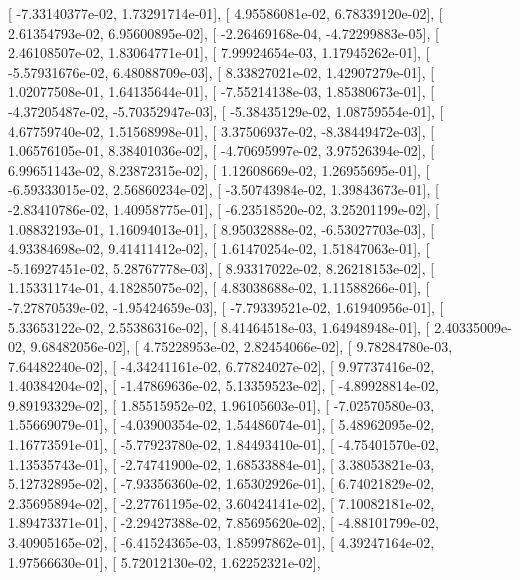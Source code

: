 \documentclass{article}
\begin{document}
       [ -7.33140377e-02,   1.73291714e-01],
       [  4.95586081e-02,   6.78339120e-02],
       [  2.61354793e-02,   6.95600895e-02],
       [ -2.26469168e-04,  -4.72299883e-05],
       [  2.46108507e-02,   1.83064771e-01],
       [  7.99924654e-03,   1.17945262e-01],
       [ -5.57931676e-02,   6.48088709e-03],
       [  8.33827021e-02,   1.42907279e-01],
       [  1.02077508e-01,   1.64135644e-01],
       [ -7.55214138e-03,   1.85380673e-01],
       [ -4.37205487e-02,  -5.70352947e-03],
       [ -5.38435129e-02,   1.08759554e-01],
       [  4.67759740e-02,   1.51568998e-01],
       [  3.37506937e-02,  -8.38449472e-03],
       [  1.06576105e-01,   8.38401036e-02],
       [ -4.70695997e-02,   3.97526394e-02],
       [  6.99651143e-02,   8.23872315e-02],
       [  1.12608669e-02,   1.26955695e-01],
       [ -6.59333015e-02,   2.56860234e-02],
       [ -3.50743984e-02,   1.39843673e-01],
       [ -2.83410786e-02,   1.40958775e-01],
       [ -6.23518520e-02,   3.25201199e-02],
       [  1.08832193e-01,   1.16094013e-01],
       [  8.95032888e-02,  -6.53027703e-03],
       [  4.93384698e-02,   9.41411412e-02],
       [  1.61470254e-02,   1.51847063e-01],
       [ -5.16927451e-02,   5.28767778e-03],
       [  8.93317022e-02,   8.26218153e-02],
       [  1.15331174e-01,   4.18285075e-02],
       [  4.83038688e-02,   1.11588266e-01],
       [ -7.27870539e-02,  -1.95424659e-03],
       [ -7.79339521e-02,   1.61940956e-01],
       [  5.33653122e-02,   2.55386316e-02],
       [  8.41464518e-03,   1.64948948e-01],
       [  2.40335009e-02,   9.68482056e-02],
       [  4.75228953e-02,   2.82454066e-02],
       [  9.78284780e-03,   7.64482240e-02],
       [ -4.34241161e-02,   6.77824027e-02],
       [  9.97737416e-02,   1.40384204e-02],
       [ -1.47869636e-02,   5.13359523e-02],
       [ -4.89928814e-02,   9.89193329e-02],
       [  1.85515952e-02,   1.96105603e-01],
       [ -7.02570580e-03,   1.55669079e-01],
       [ -4.03900354e-02,   1.54486074e-01],
       [  5.48962095e-02,   1.16773591e-01],
       [ -5.77923780e-02,   1.84493410e-01],
       [ -4.75401570e-02,   1.13535743e-01],
       [ -2.74741900e-02,   1.68533884e-01],
       [  3.38053821e-03,   5.12732895e-02],
       [ -7.93356360e-02,   1.65302926e-01],
       [  6.74021829e-02,   2.35695894e-02],
       [ -2.27761195e-02,   3.60424141e-02],
       [  7.10082181e-02,   1.89473371e-01],
       [ -2.29427388e-02,   7.85695620e-02],
       [ -4.88101799e-02,   3.40905165e-02],
       [ -6.41524365e-03,   1.85997862e-01],
       [  4.39247164e-02,   1.97566630e-01],
       [  5.72012130e-02,   1.62252321e-02],
\end{document}
